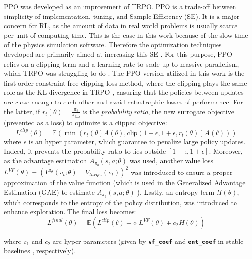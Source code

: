 \documentclass[a4paper]{article}
\newcommand{\code}[1]{\colorbox{light-gray}{\small\color{blue}\textbf{\texttt{#1}}}}
\begin{document}
PPO was developed as an improvement of TRPO. PPO is a trade-off between simplicity of implementation, tuning, and Sample Efficiency (SE). It is a major concern for RL, as the amount of data in real world problems is usually scarce per unit of computing time. This is the case in this work because of the slow time of the physics simulation software. Therefore the optimization techniques developed are primarily aimed at increasing this SE \cite{wu2017scalable}.  For this purpose, PPO relies on a clipping term and a learning rate to scale up to massive parallelism, which TRPO was struggling to do \cite{schulman2017proximal}. The PPO version utilized in this work is the first-order constraint-free clipping loss method, where the clipping plays the same role as the KL divergence in TRPO \cite{schulman2017trust}, ensuring that the policies between updates are close enough to each other and avoid catastrophic losses of performance. For the latter, if $r_t(\theta) = \frac{\pi_{\theta}}{\pi_{\theta_{old}}}$ is the \textit{probability ratio}, the new surrogate objective (presented as a loss) to  optimize is a clipped objective:
\begin{equation}
L^{clip}(\theta) = \mathbb{E}(\min(r_t(\theta)A(\theta),\text{clip}(1 - \epsilon,1 +\epsilon, r_t(\theta))A(\theta)))
\label{eq:clipped_obj}
\end{equation}
where $\epsilon$ is an hyper parameter, which guarantee to penalize large policy updates. Indeed, it prevents the probability ratio to lies outside $[1-\epsilon,1+\epsilon]$. Moreover, as the advantage estimation $A_{\pi_{\theta}}(s,a;\theta)$ was used, another value loss $L^{VF}(\theta) = (V^{\pi_{\theta}}(s_t;\theta) - V_{target}(s_t))^2$ was introduced to ensure a proper approximation of the value function (which is used in the Generalized Advantage Estimation (GAE) to estimate $A_{\pi_{\theta}}(s,a;\theta)$ \cite{schulman2017proximal}). Lastly, an entropy term $H(\theta)$, which corresponds to the entropy of the policy distribution, was introduced to enhance exploration. The final loss becomes:
\begin{equation}
    L^{final}(\theta) = \mathbb{E}(L^{clip}(\theta) - c_1L^{VF}(\theta) + c_2 H(\theta))
    \label{eq:ppoloss}
\end{equation}

where $c_1$ and $c_2$ are hyper-parameters (given by \code{vf\_coef} and \code{ent\_coef} in stable-baselines \cite{stable-baselines}, respectively).
\end{document}
